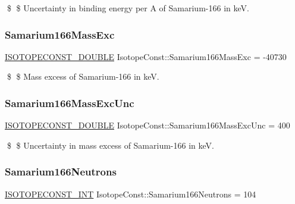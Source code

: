 \$ \$ Uncertainty in binding energy per A of Samarium-\/166 in keV. \mbox{\label{group___isotope_const-_samarium-_sm166_gae61fbe7ba370679e195bf7695df8b0f6}} 
\subsubsection{\texorpdfstring{Samarium166\+Mass\+Exc}{Samarium166MassExc}}
{\footnotesize\ttfamily \mbox{\hyperlink{group___isotope_const-_macros_ga8f45a7272ce02c0b4c65c44636ed719a}{I\+S\+O\+T\+O\+P\+E\+C\+O\+N\+S\+T\+\_\+\+D\+O\+U\+B\+LE}} Isotope\+Const\+::\+Samarium166\+Mass\+Exc = -\/40730}

\$ \$ Mass excess of Samarium-\/166 in keV. \mbox{\label{group___isotope_const-_samarium-_sm166_ga6b8a1471ba89d9892bb6bde036c02f73}} 
\subsubsection{\texorpdfstring{Samarium166\+Mass\+Exc\+Unc}{Samarium166MassExcUnc}}
{\footnotesize\ttfamily \mbox{\hyperlink{group___isotope_const-_macros_ga8f45a7272ce02c0b4c65c44636ed719a}{I\+S\+O\+T\+O\+P\+E\+C\+O\+N\+S\+T\+\_\+\+D\+O\+U\+B\+LE}} Isotope\+Const\+::\+Samarium166\+Mass\+Exc\+Unc = 400}

\$ \$ Uncertainty in mass excess of Samarium-\/166 in keV. \mbox{\label{group___isotope_const-_samarium-_sm166_ga502357ea3f084730e98b2712992e9924}} 
\subsubsection{\texorpdfstring{Samarium166\+Neutrons}{Samarium166Neutrons}}
{\footnotesize\ttfamily \mbox{\hyperlink{group___isotope_const-_macros_ga5f18360b3e99483a35c32d789e62621c}{I\+S\+O\+T\+O\+P\+E\+C\+O\+N\+S\+T\+\_\+\+I\+NT}} Isotope\+Const\+::\+Samarium166\+Neutrons = 104}


